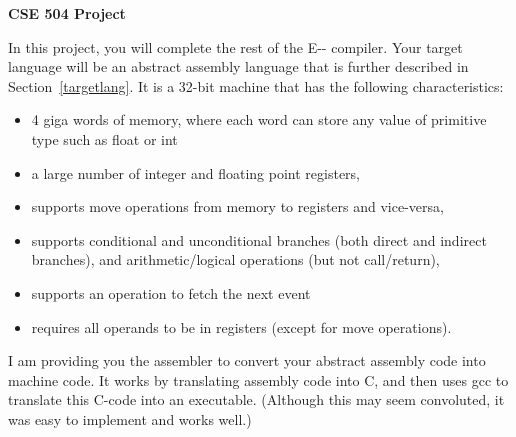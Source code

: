 \documentclass{article}
\begin{document}
\newcommand{\LB}{$[$}
\newcommand{\RB}{$]\;$}
\newcommand{\LP}{$($}
\newcommand{\RP}{$)\;$}

\begin{center}
{\Large \bf CSE 504  Project}\\[0.1in]
\end{center}
In this project, you will complete the rest of the E-{}- compiler. Your
target language will be an abstract assembly language that is
further described in Section~\ref{targetlang}. It is a 32-bit
machine that has the following characteristics:
\begin{itemize}
\item 4 giga words of memory, where each word can store any value of
  primitive type such as float or int
\item a large number of integer and floating point registers,
\item supports move operations from memory to registers and vice-versa,
\item supports conditional and unconditional branches (both direct and
  indirect branches), and arithmetic/logical operations (but not
  call/return),
\item supports an operation to fetch the next event
\item requires all operands to be in registers (except for move operations).
\end{itemize}
%
I am providing you the assembler to convert your abstract assembly code
into machine code. It works by translating assembly code into C, and then
uses gcc to translate this C-code into an executable. (Although this may
seem convoluted, it was easy to implement and works well.)
\end{document}
